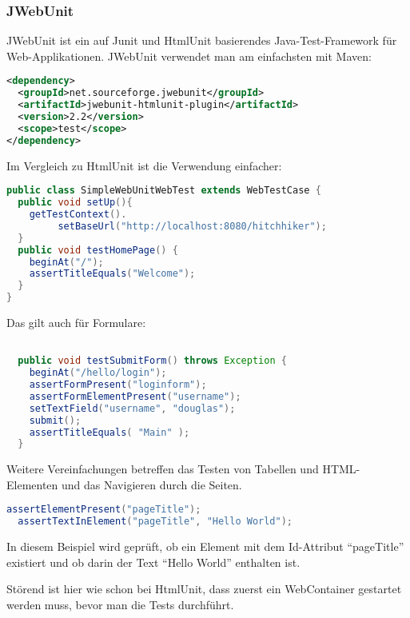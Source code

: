 \subsubsection{JWebUnit}
JWebUnit ist ein auf Junit und HtmlUnit basierendes
Java-Test-Framework für Web-Applikationen. JWebUnit verwendet man am
einfachsten mit Maven:
\begin{lstlisting}[language=xml,
  morekeywords={dependency,groupId,artifactId,version,scope}]
<dependency>
  <groupId>net.sourceforge.jwebunit</groupId>
  <artifactId>jwebunit-htmlunit-plugin</artifactId>
  <version>2.2</version>
  <scope>test</scope>
</dependency>
 \end{lstlisting}
\newslide
Im Vergleich zu HtmlUnit ist die Verwendung einfacher:
\begin{lstlisting}[language=java]
public class SimpleWebUnitWebTest extends WebTestCase {
  public void setUp(){
    getTestContext().
         setBaseUrl("http://localhost:8080/hitchhiker");
  }
  public void testHomePage() {
    beginAt("/");
    assertTitleEquals("Welcome");
  }
}
\end{lstlisting}
\newslide
Das gilt auch für Formulare:
\begin{lstlisting}[language=java]

  public void testSubmitForm() throws Exception {
    beginAt("/hello/login");
    assertFormPresent("loginform");
    assertFormElementPresent("username");
    setTextField("username", "douglas");
    submit();
    assertTitleEquals( "Main" );
  }
\end{lstlisting}
\newslide
Weitere Vereinfachungen betreffen das Testen von Tabellen und HTML-Elementen
und das Navigieren durch die Seiten.
\begin{lstlisting}[language=java]
  assertElementPresent("pageTitle");
  assertTextInElement("pageTitle", "Hello World");
\end{lstlisting}
In diesem Beispiel wird geprüft, ob ein Element
mit dem Id-Attribut ``pageTitle'' existiert und ob darin der
Text ``Hello World'' enthalten ist.

\newslide
Störend ist hier wie schon bei HtmlUnit, 
dass zuerst ein WebContainer gestartet
werden muss, bevor man die Tests durchführt.

